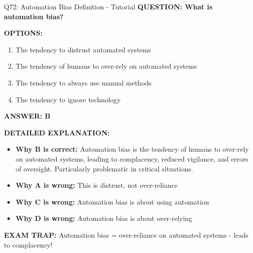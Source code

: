 \documentclass[8pt]{beamer}
\begin{document}
	\begin{frame}{Q72: Automation Bias Definition - Tutorial}
		\fontsize{6.5}{7.5}\selectfont
		\textbf{QUESTION: What is automation bias?}
		
		\vspace{0.1cm}
		\textbf{OPTIONS:}
		\begin{enumerate}
			\item The tendency to distrust automated systems
			\item The tendency of humans to over-rely on automated systems
			\item The tendency to always use manual methods
			\item The tendency to ignore technology
		\end{enumerate}
		
		\vspace{0.1cm}
		\textcolor{myblue}{\textbf{ANSWER: B}}
		
		\vspace{0.1cm}
		\textbf{DETAILED EXPLANATION:}
		\begin{itemize}
			\item \textbf{Why B is correct:} Automation bias is the tendency of humans to over-rely on automated systems, leading to complacency, reduced vigilance, and errors of oversight. Particularly problematic in critical situations.
			\item \textbf{Why A is wrong:} This is distrust, not over-reliance
			\item \textbf{Why C is wrong:} Automation bias is about using automation
			\item \textbf{Why D is wrong:} Automation bias is about over-relying
		\end{itemize}
		
		\textcolor{myred}{\textbf{EXAM TRAP:}} Automation bias = \textcolor{myblue}{over-reliance on automated systems} - leads to complacency!
	\end{frame}
	
\end{document}
